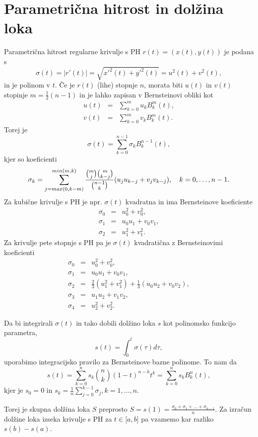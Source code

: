 \documentclass[a4paper]{article}
\begin{document}
	\section{Parametrična hitrost in dolžina loka}
	Parametrična hitrost regularne krivulje s PH $r (t) = (x (t), y (t))$ je podana s 
	$$\sigma (t) = | r\prime (t) | =\sqrt{x\prime^2(t)+y\prime^2(t)}= u^2 (t) + v^2 (t),$$
	in je polinom v $t$. Če je $r (t)$ (lihe) stopnje $n$, morata biti $u (t)$ in $v (t)$ stopinje $m = \frac{1}{2}(n - 1)$ in je lahko zapisan v Bernsteinovi obliki kot
	\begin{eqnarray}
	u (t) &=&\sum_{k=0}^m u_kB_k^m(t),\nonumber\\
	v (t)&=&\sum_{k=0}^m v_kB_k^m(t).\nonumber
	\end{eqnarray}
	Torej je
	$$\sigma (t) =\sum_{k=0}^{n-1} \sigma_kB_k^{n-1}(t),$$
	kjer so koeficienti 
	$$\sigma_k =\sum_{j=max(0,k-m)}^{min(m,k)}\frac{\binom{m}{j}\binom{m}{k-j}}{\binom{n-1}{k}}(u_ju_{k-j}+v_jv_{k-j}),\hspace{10px} k = 0,\ldots , n - 1.$$
	Za kubične krivulje s PH je npr. $\sigma (t)$ kvadratna in ima Bernsteinove koeficiente
	\begin{eqnarray}
	\sigma_0 &=& u^2_0+ v^2_0, \nonumber\\
	\sigma_1 &=& u_0u_1 + v_0v_1, \nonumber\\
	\sigma_2 &=& u^2_1+ v^2_1.\nonumber
	\end{eqnarray}
	Za krivulje pete stopnje s PH pa je $\sigma(t)$ kvadratična z Bernsteinovimi koeficienti
	\begin{eqnarray}
	\sigma_0&=&u_0^2+v_0^2,\nonumber\\
	\sigma_1&=&u_0u_1+v_0v_1,\nonumber\\
	\sigma_2&=&\frac{2}{3}(u_1^2+v_1^2)+\frac{1}{3}(u_0u_2+v_0v_2),\nonumber\\
	\sigma_3&=&u_1u_2+v_1v_2,\nonumber\\
	\sigma_4&=&u_2^2+v_2^2.\nonumber
	\end{eqnarray}
	
	Da bi integrirali $\sigma (t)$ in tako dobili dolžino loka $s$ kot polinomsko funkcijo parametra,
	$$s (t) =\int^t_0\sigma(\tau) d\tau,$$
	uporabimo integracijsko pravilo za Bernsteinove bazne polinome. To nam da
	$$s (t) =\sum^n_{k=0}s_k\binom{n}{k}(1-t)^{n-k}t^k=\sum_{k=0}^n s_kB^n_k(t),$$
	kjer je $s_0=0$ in $s_k=\frac{1}{n}\sum^{k-1}_{j=0}\sigma_j, k=1,\ldots,n.$
	
	Torej je skupna dolžina loka $S$ preprosto
	$S = s (1) = \frac{\sigma_0+\sigma_1+\ldots+\sigma_{n-1}}{n}.$
	Za izračun dolžine loka izseka krivulje s PH za $t\in\lbrack a, b\rbrack$ pa vzamemo kar razliko $s (b) -s (a)$.
	
\end{document}
